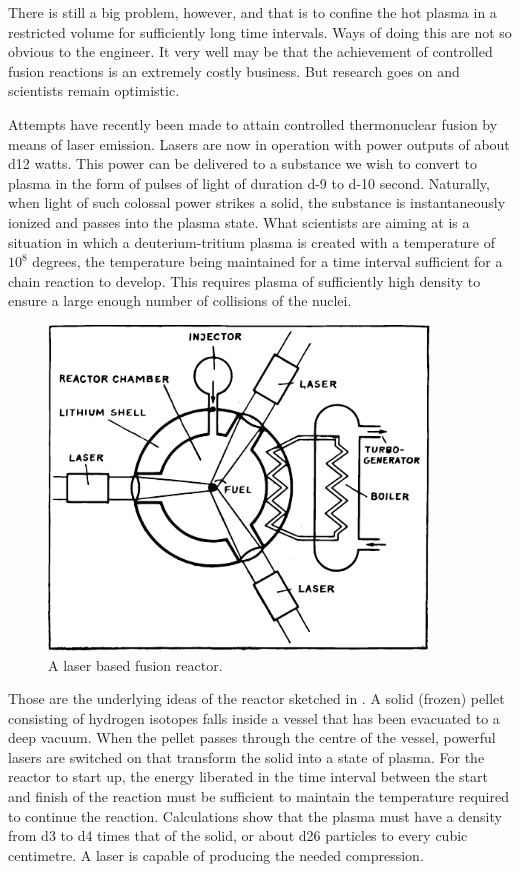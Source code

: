 There is still a big problem, however, and that is to confine the hot plasma in a restricted volume for suffi­ciently long time intervals. Ways of doing this are not so obvious to the engineer. It very well may be that the achievement of controlled fusion reactions is an extreme­ly costly business. But research goes on and scientists remain optimistic.

Attempts have recently been made to attain controlled thermonuclear fusion by means of laser emission. Lasers are now in operation with power outputs of about \num{d12} watts. This power can be delivered to a substance we wish to convert to plasma in the form of pulses of light of duration \num{d-9} to \num{d-10} second. Naturally, when light of such colossal power strikes a solid, the substance is instantaneously ionized and passes into the plasma state. What scientists are aiming at is a situation in which a deuterium-tritium plasma is created with a temperature of $10^{8}$ degrees, the temperature being maintained for a time interval sufficient for a chain reaction to develop. This requires plasma of sufficiently high density to ensure a large enough number of collisions of the nuclei.

\begin{figure}[!ht]
\centering
\includegraphics[width=0.9\textwidth]{figures/fig-06-03.pdf}
\caption{A laser based fusion reactor.}
\label{fig-6.3}
\end{figure}

Those are the underlying ideas of the reactor sketched in . A solid (frozen) pellet consisting of hydro­gen isotopes falls inside a vessel that has been evacuated to a deep vacuum. When the pellet passes through the centre of the vessel, powerful lasers are switched on that transform the solid into a state of plasma. For the reactor to start up, the energy liberated in the time interval between the start and finish of the reaction must be sufficient to maintain the temperature required to con­tinue the reaction. Calculations show that the plasma must have a density from \num{d3} to \num{d4} times that of the solid, or about \num{d26} particles to every cubic centimetre. A laser is capable of producing the needed compression. 

